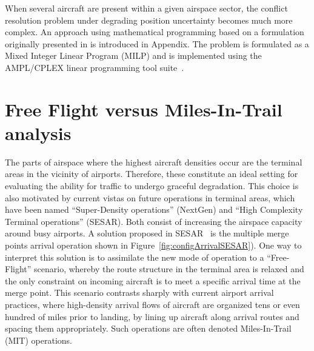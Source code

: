 \documentclass[a4paper, 10pt]{IEEEtran}
\begin{document}
When several aircraft are present within a given airspace sector, the conflict resolution problem under degrading position uncertainty becomes much more complex. An approach using mathematical programming based on a formulation originally presented in \cite{PallottinoConflitResolution} is introduced in Appendix. 
 The problem is formulated as a Mixed Integer Linear Program (MILP) and is implemented using the AMPL/CPLEX linear programming tool suite~\cite{AMPL,CPLEX}.








\section{Free Flight versus Miles-In-Trail analysis}
The parts of airspace where the highest aircraft densities occur are the terminal areas in the vicinity of airports. Therefore, these constitute an ideal setting for evaluating the ability for traffic to undergo graceful degradation. 
This choice is also motivated by current vistas on future operations in terminal areas, which have been named ``Super-Density operations'' (NextGen) and ``High Complexity Terminal operations'' (SESAR). Both consist of increasing the airspace capacity around busy airports. A solution proposed in SESAR~\cite{SESARconceptOfOperation} is the multiple merge points arrival operation shown in Figure~\ref{fig:configArrivalSESAR}). One way to interpret this solution is to assimilate the new mode of operation to a ``Free-Flight'' scenario, whereby the route structure in the terminal area is relaxed and the only constraint on incoming aircraft is to meet a specific arrival time at the merge point. 
This scenario contrasts sharply with current airport arrival practices, where high-density arrival flows of aircraft are organized tens or even hundred of miles prior to landing, by lining up aircraft along arrival routes and spacing them appropriately. Such operations are often denoted Miles-In-Trail (MIT) operations.
\end{document}
